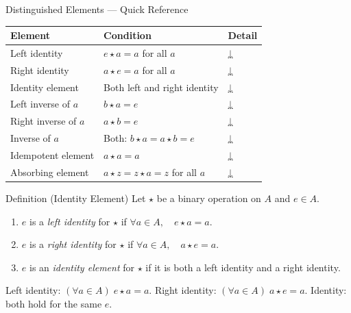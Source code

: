 \begin{toolkitbox}{Distinguished Elements — Quick Reference}
\small
\begin{tabular}{l l l}
\toprule
\textbf{Element} & \textbf{Condition} & \textbf{Detail} \\
\midrule
Left identity     & $e \star a = a$ for all $a$                     & \hyperref[def:identity-element]{↓} \\
Right identity    & $a \star e = a$ for all $a$                     & \hyperref[def:identity-element]{↓} \\
Identity element  & Both left and right identity                    & \hyperref[def:identity-element]{↓} \\
Left inverse of $a$   & $b \star a = e$                             & \hyperref[def:inverse-element]{↓} \\
Right inverse of $a$  & $a \star b = e$                             & \hyperref[def:inverse-element]{↓} \\
Inverse of $a$        & Both: $b \star a = a \star b = e$           & \hyperref[def:inverse-element]{↓} \\
Idempotent element    & $a \star a = a$                             & \hyperref[def:idempotent-element]{↓} \\
Absorbing element     & $a \star z = z \star a = z$ for all $a$     & \hyperref[def:absorbing-element]{↓} \\
\bottomrule
\end{tabular}
\end{toolkitbox}


\begin{definitionbox}{Definition (Identity Element)}
\label{def:identity-element}
Let $\star$ be a binary operation on $A$ and $e \in A$.
\begin{enumerate}[label=(\roman*)]
  \item $e$ is a \emph{left identity} for $\star$ if
        $\forall a \in A,\quad e \star a = a$.
  \item $e$ is a \emph{right identity} for $\star$ if
        $\forall a \in A,\quad a \star e = a$.
  \item $e$ is an \emph{identity element} for $\star$ if it is both a
        left identity and a right identity.
\end{enumerate}
\end{definitionbox}

\begin{remark}
Left identity: $(\forall a \in A)\; e \star a = a$.
Right identity: $(\forall a \in A)\; a \star e = a$.
Identity: both hold for the same $e$.
\end{remark}

